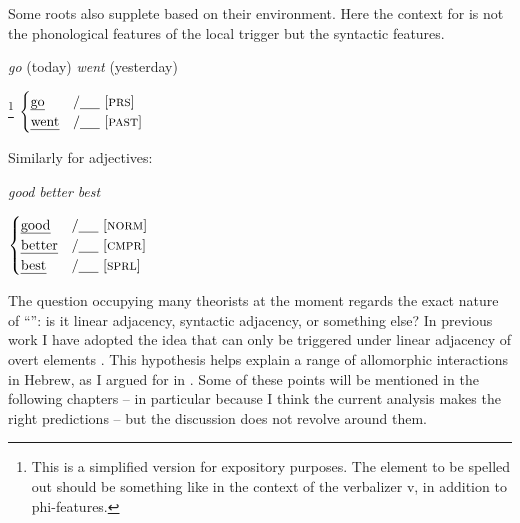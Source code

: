 \begin{exe}
\begin{xlist}
\begin{exe}
\begin{exe}
\begin{exe}
\begin{exe}
\begin{xlist}
\begin{exe}
\begin{xlist}
\begin{xlist}
\begin{xlist}
\begin{exe}
\begin{xlist}
\begin{exe}
\begin{exe}
\begin{xlist}
\begin{exe}
\begin{xlist}
\begin{exe}
\begin{exe}
\begin{xlist}
\begin{exe}
\begin{xlist}
\begin{exe}
\begin{xlist}
\begin{exe}
\begin{exe}
\begin{xlist}
\begin{exe}
Some roots also supplete based on their environment. Here the context for  is not the phonological features of the local trigger but the syntactic features.
 \begin{exe}
 \ex  
 \begin{xlist} 
 	\ex  \emph{go} (today) 
 	\ex  \emph{went} (yesterday) 
 \z

\ex   {}\footnote{This is a simplified version for expository purposes. The element to be spelled out should be something like  in the context of the verbalizer v, in addition to phi-features.} \lra $\begin{cases} 
	\text{\emph{go}} & / \trace~ \text{[\gsc{PRS}]} \\
	\text{\emph{went}} & / \trace ~ \text{[\gsc{PAST}]} \\
	\end{cases}$
 \z \label{r1:1:4}

Similarly for adjectives:
 \begin{exe}
 \ex  
 \begin{xlist} 
 	\ex  \emph{good}		 
 	\ex  \emph{better} 
 	\ex  \emph{best} 
 \z

\ex  {} \lra $\begin{cases} 
	\text{\emph{good}} & / \trace~ \text{[\gsc{NORM}]} \\
	\text{\emph{better}} & / \trace ~ \text{[\gsc{CMPR}]} \\
	\text{\emph{best}} & / \trace ~ \text{[\gsc{SPRL}]} \\
	\end{cases}$
 \z 

The question occupying many theorists at the moment regards the exact nature of ``\trace'': is it linear adjacency, syntactic adjacency, or something else? In previous work I have adopted the idea that  can only be triggered under linear adjacency of overt elements \citep{embick10,marantz13}. This hypothesis helps explain a range of allomorphic interactions in Hebrew, as I argued for in \cite{kastner18nllt}. Some of these points will be mentioned in the following chapters -- in particular because I think the current analysis makes the right predictions -- but the discussion does not revolve around them.


\end{xlist}
\end{exe}
\end{xlist}
\end{exe}
\end{exe}
\end{xlist}
\end{exe}
\end{exe}
\end{xlist}
\end{exe}
\end{xlist}
\end{exe}
\end{xlist}
\end{exe}
\end{exe}
\end{xlist}
\end{exe}
\end{xlist}
\end{exe}
\end{exe}
\end{xlist}
\end{exe}
\end{xlist}
\end{xlist}
\end{xlist}
\end{exe}
\end{xlist}
\end{exe}
\end{exe}
\end{exe}
\end{exe}
\end{xlist}
\end{exe}
